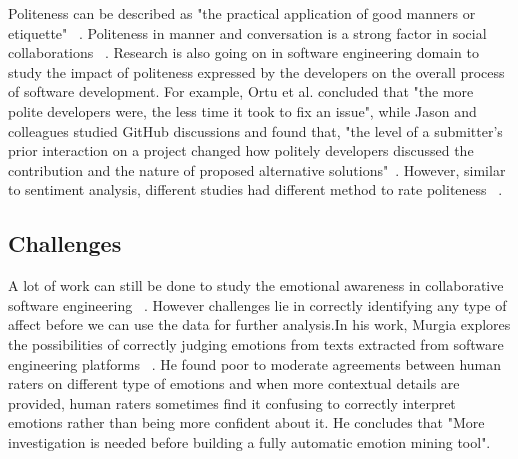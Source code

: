 Politeness can be described as "the practical application of good manners or etiquette" ~\cite{wiki:pol}. Politeness in manner and conversation is a strong factor in social collaborations ~\cite{ortu2015would,wang2008politeness}. Research is also going on in software engineering domain to study the impact of politeness expressed by the developers on the overall process of software development. For example, Ortu et al. concluded that "the more polite developers were, the less time it took to fix an issue", while Jason and colleagues studied GitHub discussions and found that, "the level of a submitter's prior interaction on a project changed how politely developers discussed the contribution and the nature of proposed alternative solutions"~\cite{ortu2015would,tsay2014let}. However, similar to sentiment analysis, different studies had different method to rate politeness ~\cite{tsay2014let,brownsoftware}.


\subsection{Challenges}

A lot of work can still be done to study the emotional awareness in collaborative software engineering ~\cite{dewan2015towards}. However challenges lie in correctly identifying any type of affect before we can use the data for further analysis.In his work, Murgia explores the possibilities of correctly judging emotions from texts extracted from software engineering platforms ~\cite{murgia2014developers}. He found poor to moderate agreements between human raters on different type of emotions and when more contextual details are provided, human raters sometimes find it confusing to correctly interpret emotions rather than being more confident about it. He concludes that "More investigation is needed before building a fully automatic emotion mining tool".

